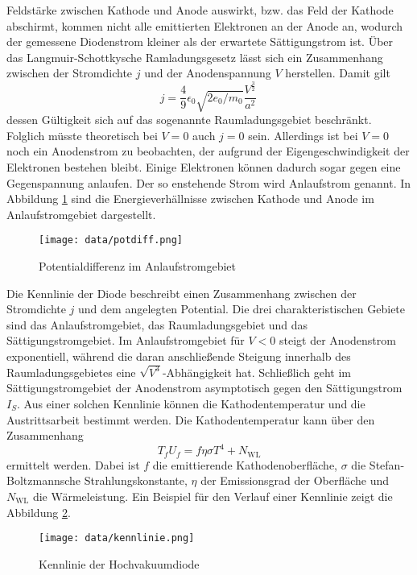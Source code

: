 Feldstärke zwischen Kathode und Anode auswirkt, bzw. das Feld der Kathode abschirmt, kommen nicht alle emittierten Elektronen an der Anode an,
wodurch der gemessene Diodenstrom kleiner als der erwartete Sättigungstrom ist. Über das Langmuir-Schottkysche Ramladungsgesetz lässt sich ein 
Zusammenhang zwischen der Stromdichte $j$ und der Anodenspannung $V$ herstellen. Damit gilt 
\begin{equation}
    j = \frac{4}9 \epsilon_0 \sqrt{2e_0/m_0} \frac{V^{\frac{3}2}}{a^2}\,
    \label{eqn:langmuir}
\end{equation}
dessen Gültigkeit sich auf das sogenannte Raumladungsgebiet beschränkt. Folglich müsste theoretisch bei $V=0$ auch $j=0$ sein. Allerdings 
ist bei $V=0$ noch ein Anodenstrom zu beobachten, der aufgrund der Eigengeschwindigkeit der Elektronen bestehen bleibt. Einige Elektronen 
können dadurch sogar gegen eine Gegenspannung anlaufen. Der so enstehende Strom wird Anlaufstrom genannt. In Abbildung \ref{fig:anlauf} sind 
die Energieverhällnisse zwischen Kathode und Anode im Anlaufstromgebiet dargestellt. 
\begin{figure}
    \centering
    \texttt{[image: data/potdiff.png]}
    \caption{Potentialdifferenz im Anlaufstromgebiet}
    \label{fig:anlauf}
\end{figure}
\FloatBarrier

Die Kennlinie der Diode beschreibt einen Zusammenhang zwischen der Stromdichte $j$ und dem angelegten Potential. Die drei charakteristischen 
Gebiete sind das Anlaufstromgebiet, das Raumladungsgebiet und das Sättigungstromgebiet. Im Anlaufstromgebiet für $V < 0$ steigt der Anodenstrom
exponentiell, während die daran anschließende Steigung innerhalb des Raumladungsgebietes eine $\sqrt{V^3}$-Abhängigkeit hat. Schließlich geht 
im Sättigungstromgebiet der Anodenstrom asymptotisch gegen den Sättigungstrom $I_S$.
Aus einer solchen Kennlinie können die Kathodentemperatur und die Austrittsarbeit bestimmt werden.
Die Kathodentemperatur kann über den Zusammenhang 
\begin{equation}
    T_f U_f = f \eta \sigma T^4 + N_\text{WL}
    \label{eqn:T} 
\end{equation} 
ermittelt werden. Dabei ist $f$ die emittierende Kathodenoberfläche, $\sigma$ die Stefan-Boltzmannsche Strahlungskonstante, $\eta$ der 
Emissionsgrad der Oberfläche und $N_\text{WL} $ die Wärmeleistung. 
Ein Beispiel für den Verlauf einer Kennlinie zeigt die 
Abbildung \ref{fig:kennlinie}. 
\begin{figure}
    \centering
    \texttt{[image: data/kennlinie.png]}
    \caption{Kennlinie der Hochvakuumdiode}
    \label{fig:kennlinie}
\end{figure}
\FloatBarrier

